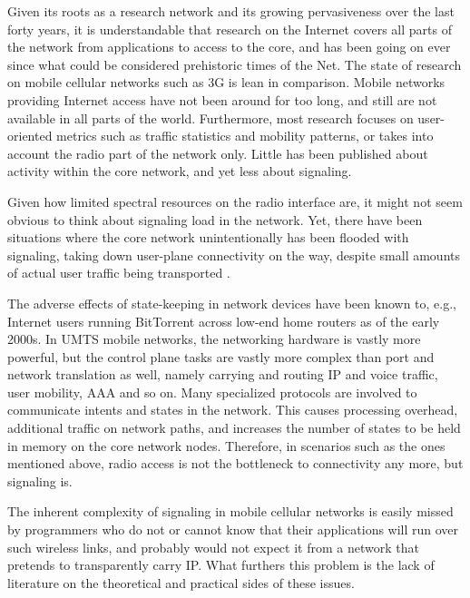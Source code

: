 
Given its roots as a research network and its growing pervasiveness over the last forty years, it is understandable that research on the Internet covers all parts of the network from applications to access to the core, and has been going on ever since what could be considered prehistoric times of the Net. The state of research on mobile cellular networks such as 3G is lean in comparison. Mobile networks providing Internet access have not been around for too long, and still are not available in all parts of the world. Furthermore, most research focuses on user-oriented metrics such as traffic statistics and mobility patterns, or takes into account the radio part of the network only. Little has been published about activity within the core network, and yet less about signaling.

Given how limited spectral resources on the radio interface are, it might not seem obvious to think about signaling load in the network. Yet, there have been situations where the core network unintentionally has been flooded with signaling, taking down user-plane connectivity on the way, despite small amounts of actual user traffic being transported \cite{lt2012docostorm, it2011birdandroid}. 

The adverse effects of state-keeping in network devices have been known to, e.g.,  Internet users running BitTorrent across low-end home routers as of the early 2000s. In \ac{UMTS} mobile networks, the networking hardware is vastly more powerful, but the control plane tasks are vastly more complex than port and network translation as well, namely carrying and routing IP and voice traffic, user mobility, \ac{AAA} and so on. Many specialized protocols are involved to communicate intents and states in the network. This causes processing overhead, additional traffic on network paths, and increases the number of states to be held in memory on the core network nodes. Therefore, in scenarios such as the ones mentioned above, radio access is not the bottleneck to connectivity any more, but signaling is.

The inherent complexity of signaling in mobile cellular networks is easily missed by programmers who do not or cannot know that their applications will run over such wireless links, and probably would not expect it from a network that pretends to transparently carry IP. What furthers this problem is the lack of literature on the theoretical and practical sides of these issues.

